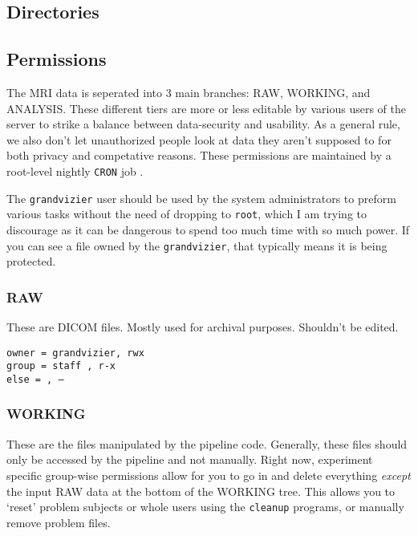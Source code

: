 \documentclass[final,titlepage,letterpaper,oneside,12pt]{article}
\begin{document}
\subsection{Directories}
\subsection{Permissions}

The MRI data is seperated into 3 main branches: RAW, WORKING, and ANALYSIS. These different tiers are more or less editable by various users of the server to strike a balance between data-security and usability. As a general rule, we also don't let unauthorized people look at data they aren't supposed to for both privacy and competative reasons. These permissions are maintained by a root-level nightly \texttt{CRON} job \color{red}{\verb=maintain_permissions.sh=}.\color{black}

The \texttt{grandvizier} user should be used by the system administrators to preform various tasks without the need of dropping to \texttt{root}, which I am trying to discourage as it can be dangerous to spend too much time with so much power. If you can see a file owned by the \texttt{grandvizier}, that typically means it is being protected.  

\subsubsection{RAW}

These are DICOM files. Mostly used for archival purposes. Shouldn't be edited.

\begin{flushleft}
\texttt{owner = grandvizier, rwx \\
        group = staff      , r-x \\
        else  =            , ---} \\
\end{flushleft}

\subsubsection{WORKING}

These are the files manipulated by the pipeline code. Generally, these files should only be accessed by the pipeline and not manually. Right now, experiment specific group-wise permissions allow for you to go in and delete everything \textit{except} the input RAW data at the bottom of the WORKING tree. This allows you to `reset' problem subjects or whole users using the \texttt{cleanup} programs, or manually remove problem files.
\end{document}
